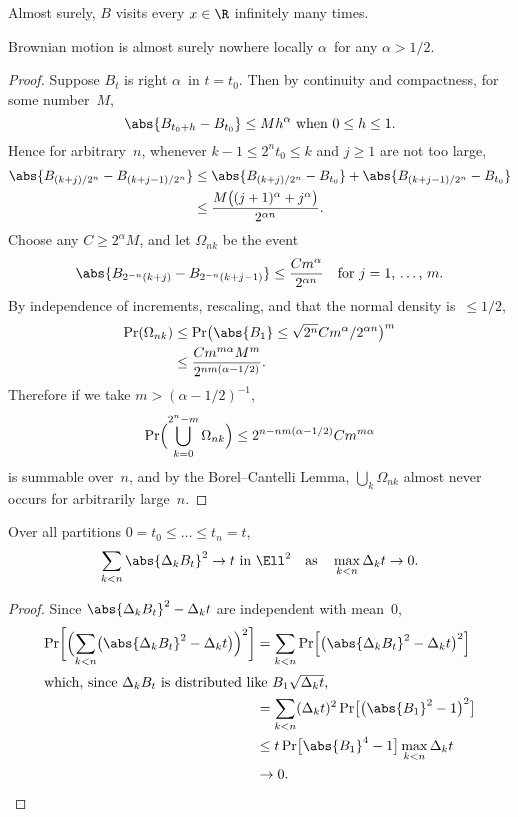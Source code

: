 \begin	{corollary}
Almost surely, $B$ visits every \( x \in \R \) infinitely many times.
\end	{corollary}

\begin	{theorem}
\label	{thm:nowhere-holder}
	Brownian motion is almost surely nowhere locally $\alpha$\dashHolder\
	for any \( \alpha > 1/2 \).
\end	{theorem}
\begin	{proof}
Suppose $B_t$ is right $\alpha$\dashHolder\ in \( t = t_0 \).
Then by continuity and compactness, for some number~$M$, \[
	\text{\( \abs{B_{t_0+h} - B_{t_0}} \le Mh^\alpha \)
		when \(0 \le h \le 1 \).}
\]
Hence for arbitrary~$n$,
whenever \( k-1 \le 2^n t_0 \le k \) and \( j \ge 1 \) are not too large,
\begin	{align*}
	\abs{ B_{(k+j)/2^n} - B_{(k+j-1)/2^n} }
	&\le	\abs{ B_{(k+j)/2^n} - B_{t_0} }
		+ \abs { B_{(k+j-1)/2^n} - B_{t_0} } \\
	&\le	\frac {M\bigl((j+1)^\alpha+j^\alpha\bigr)} {2^{\alpha n}}
	\text.
\end	{align*}
Choose any \( C \ge 2^\alpha M \), and let $\Omega_{nk}$ be the event \[
	\abs{ B_{2^{-n}(k+j)} - B_{2^{-n}(k+j-1)} } \le
		\frac {Cm^\alpha} {2^{\alpha n}}
	\quad \text{for \( j = 1 \), \dots,~$m$.}
\]
By independence of increments, rescaling,
and that the normal density is~\( \le 1/2 \),
\begin	{align*}
	\Pr(\Omega_{nk}) &\le \Pr\bigl(
		\abs{B_1} \le \sqrt{2^n} Cm^\alpha / 2^{\alpha n} \bigr)^m \\
	&\le	\frac {Cm^{m\alpha} M^m} {2^{nm(\alpha-1/2)}}
	\text.
\end	{align*}
Therefore if we take \( m > (\alpha-1/2)^{-1} \), \[
	\Pr\Bigl( \bigcup_{k=0}^{2^n-m} \Omega_{nk} \Bigr)
	\le 2^{n - nm(\alpha-1/2)} Cm^{m\alpha}
\] is summable over~$n$,
and by the Borel--Cantelli Lemma,
$\bigcup_k \Omega_{nk}$ almost never occurs for arbitrarily large~$n$.
\end	{proof}

\begin	{theorem}
Over all partitions \( 0 = t_0 \le\dots\le t_n = t \), \[
	\text{\( \sum_{k<n} \abs{\Delta_k B_t}^2 \to t \) in~$\Ell^2$}
	\quad\text{as}\quad
	\max_{k<n} \Delta_k t \to 0
	\text.
\]
\end	{theorem}
\begin	{proof}
Since \( \abs{\Delta_k B_t}^2 - \Delta_k t \) are independent with mean~$0$,
\begin	{align*}
	\Pr\biggl[
		\Bigl( \sum_{k<n}
			\bigl( \abs{\Delta_k B_t}^2 - \Delta_k t \bigr) \Bigr)^2
	\biggr]
	&=	\sum_{k<n} \Pr\Bigl[
		\bigl( \abs{\Delta_k B_t}^2 - \Delta_k t \bigr)^2
	\Bigr] \\
\intertext
	{which, since $\Delta_k B_t$ is distributed
		like~$B_1\sqrt{\Delta_kt}$,}
	&=	\sum_{k<n} (\Delta_kt)^2
		\Pr\bigl[ \bigl(\abs{B_1}^2 - 1\bigr)^2 \bigr] \\
	&\le	t \Pr\bigl[ \abs{B_1}^4 - 1 \bigr] \max_{k<n} \Delta_kt \\
	&\to 0
	\text.
	\qedhere
\end	{align*}
\end	{proof}
